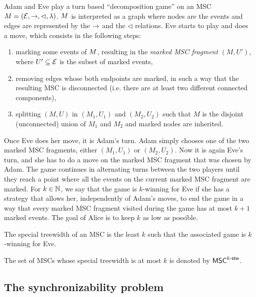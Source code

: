 Adam and Eve play a turn based ``decomposition game'' on an MSC $M = (\mathcal{E}, \to, \lhd, \lambda)$. $M$ is interpreted as a graph where nodes are the events and edges are represented by the $\to$ and the $\lhd$ relations.
Eve starts to play and does a move, which consists in the following steps:
\begin{enumerate}
	\item marking some events of $M$, resulting in the \emph{marked MSC fragment} $(M, U')$, where $U' \subseteq \mathcal{E}$ is the subset of marked events,
	\item removing edges whose both endpoints are marked, in such a way that the resulting MSC is disconnected (i.e. there are at least two different connected components),
	\item splitting $(M, U)$ in $(M_1, U_1)$ and $(M_2, U_2)$ such that $M$ is the disjoint (unconnected) union of $M_1$ and $M_2$
	and marked nodes are inherited.
\end{enumerate}
Once Eve does her move, it is Adam's turn. Adam simply chooses one of the two marked MSC fragments, either $(M_1, U_1)$ or $(M_2, U_2)$. Now it is again Eve's turn, and she has to do a move on the marked MSC fragment that was chosen by Adam. The game continues in alternating turns between the two players until they reach a point where all the events on the current marked MSC fragment are marked.
For $k \in \mathbb{N}$, we say that the game is $k$-winning for Eve if she has a strategy that allows her, independently of Adam's moves, to end the game in a way that every marked MSC fragment visited during the game has at most $k+1$ marked events. The goal of Alice is to keep $k$ as low as possible.


\newcommand{\CS}[2]{\mathsf{CS}_{(#1,#2)}}
\newcommand{\MSO}[2]{\mathsf{MSO}_{(#1,#2)}}
\newcommand{\LCPDL}[2]{\mathsf{LCPDL}_{(#1,#2)}}
\newcommand{\MSCpm}[2]{\mathsf{MSC}_{(#1,#2)}}
\newcommand{\mbMSCpm}[2]{\mathsf{MSC}_{(#1,#2)}^{\mathsf{mb}}}


\begin{fact}
	The special treewidth of an MSC is the least $k$ such that
	the associated game is $k$-winning for Eve.
\end{fact}

The set of MSCs whose special treewidth is at most $k$ is denoted by $\mathsf{MSC}^{k\textup{-}\mathsf{stw}}$.

\subsection{The synchronizability problem}

